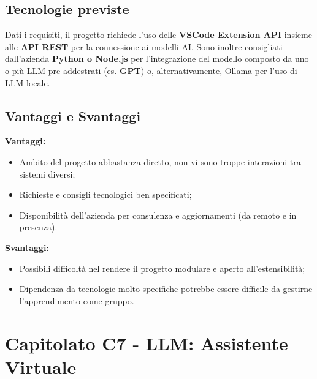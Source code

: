 \documentclass[10pt]{article}
\begin{document}
    \subsection{Tecnologie previste}
    Dati i requisiti, il progetto richiede l'uso delle \textbf{VSCode Extension API} insieme alle \textbf{API REST} per la connessione
    ai modelli AI. Sono inoltre consigliati dall'azienda \textbf{Python o Node.js} per l'integrazione del modello composto da uno o più LLM pre-addestrati (es. \textbf{GPT})
    o, alternativamente, Ollama per l'uso di LLM locale.
    
    \subsection{Vantaggi e Svantaggi}
    \textbf{Vantaggi:}
    \begin{itemize}
        \item Ambito del progetto abbastanza diretto, non vi sono troppe interazioni tra sistemi diversi;
        \item Richieste e consigli tecnologici ben specificati;
        \item Disponibilità dell'azienda per consulenza e aggiornamenti (da remoto e in presenza).
    \end{itemize}
    \textbf{Svantaggi:}
    \begin{itemize}
        \item Possibili difficoltà nel rendere il progetto modulare e aperto all'estensibilità;
        \item Dipendenza da tecnologie molto specifiche potrebbe essere difficile da gestirne l'apprendimento come gruppo.
    \end{itemize}


    \section{Capitolato C7 - LLM: Assistente Virtuale}
\end{document}
